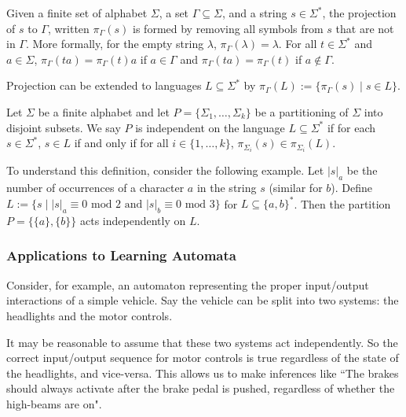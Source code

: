 Given a finite set of alphabet $\Sigma$, a set $\Gamma \subseteq \Sigma$,  and a string $s \in \Sigma^*$, the projection of $s$ to $\Gamma$, written $\pi_\Gamma(s)$ is formed by removing all symbols from $s$ that are not in $\Gamma$. 
More formally, for the empty string $\lambda$, $\pi_\Gamma(\lambda) = \lambda$. 
For all $t \in \Sigma^*$ and $a \in \Sigma$, $\pi_\Gamma(ta) = \pi_\Gamma(t)a$ if $a \in \Gamma$ and $\pi_\Gamma(ta) = \pi_\Gamma(t)$ if $a \not\in \Gamma$.

Projection can be extended to languages $L \subseteq \Sigma^*$ by $\pi_\Gamma(L) := \{ \pi_\Gamma(s) \mid s\in L\}$. 

\begin{definition}
Let $\Sigma$ be a finite alphabet and let $P = \{\Sigma_1, \dots, \Sigma_k\}$ be a partitioning of $\Sigma$ into disjoint subsets. 
We say $P$ is independent on the language $L \subseteq \Sigma^*$ if for each $s \in \Sigma^*$, $s\in L$  if and only if for all $i \in \{1, \dots, k\}$, $\pi_{\Sigma_i}(s) \in  \pi_{\Sigma_i}(L)$.
\end{definition}

To understand this definition, consider the following example.
Let $|s|_a$ be the number of occurrences of a character $a$ in the string $s$ (similar for $b$).
Define $L := \{ s \mid |s|_a \equiv 0 \mbox{ mod } 2  \mbox{ and } |s|_b \equiv 0 \mbox{ mod } 3 \}$ for $L \subseteq \{a, b\}^*$.
Then the partition $P = \{ \{a \}, \{b\} \}$ acts independently on $L$.



\subsubsection{Applications to Learning Automata}

Consider, for example, an automaton representing the proper input/output interactions of a simple vehicle. 
Say the vehicle can be split into two systems: the headlights and the motor controls. 

It may be reasonable to assume that these two systems act independently. 
So the correct input/output sequence for motor controls is true regardless of the state of the headlights, and vice-versa. 
This allows us to make inferences like ``The brakes should always activate after the brake pedal is pushed, regardless of whether the high-beams are on". 









